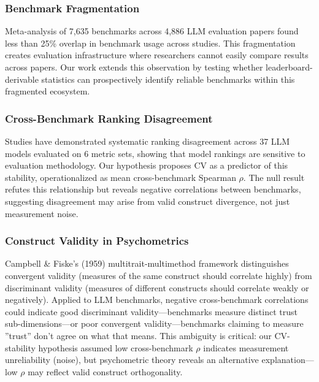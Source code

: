 
\subsubsection{Benchmark Fragmentation}

Meta-analysis of 7,635 benchmarks across 4,886 LLM evaluation papers found less than 25\% overlap in benchmark usage across studies. This fragmentation creates evaluation infrastructure where researchers cannot easily compare results across papers. Our work extends this observation by testing whether leaderboard-derivable statistics can prospectively identify reliable benchmarks within this fragmented ecosystem.

\subsubsection{Cross-Benchmark Ranking Disagreement}

Studies have demonstrated systematic ranking disagreement across 37 LLM models evaluated on 6 metric sets, showing that model rankings are sensitive to evaluation methodology. Our hypothesis proposes CV as a predictor of this stability, operationalized as mean cross-benchmark Spearman $\rho$. The null result refutes this relationship but reveals negative correlations between benchmarks, suggesting disagreement may arise from valid construct divergence, not just measurement noise.

\subsubsection{Construct Validity in Psychometrics}

Campbell \& Fiske's (1959) multitrait-multimethod framework distinguishes convergent validity (measures of the same construct should correlate highly) from discriminant validity (measures of different constructs should correlate weakly or negatively). Applied to LLM benchmarks, negative cross-benchmark correlations could indicate good discriminant validity---benchmarks measure distinct trust sub-dimensions---or poor convergent validity---benchmarks claiming to measure ''trust'' don't agree on what that means. This ambiguity is critical: our CV-stability hypothesis assumed low cross-benchmark $\rho$ indicates measurement unreliability (noise), but psychometric theory reveals an alternative explanation---low $\rho$ may reflect valid construct orthogonality.
